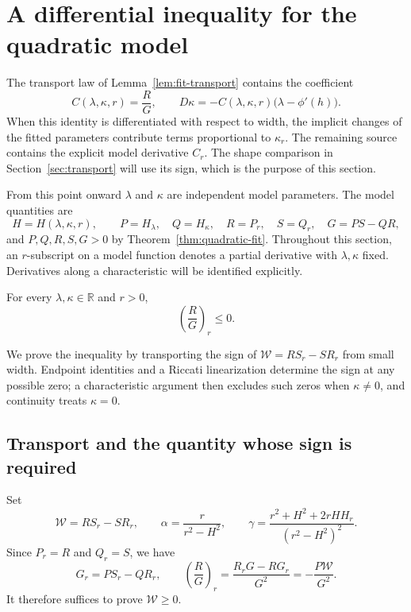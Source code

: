 \section{A differential inequality for the quadratic model}
\label{sec:model}

The transport law of Lemma~\ref{lem:fit-transport} contains the
coefficient
\[
 C(\lambda,\kappa,r)=\frac{R}{G},\qquad
 D\kappa=-C(\lambda,\kappa,r)\bigl(\lambda-\phi'(h)\bigr).
\]
When this identity is differentiated with respect to width, the
implicit changes of the fitted parameters contribute terms proportional
to $\kappa_r$. The remaining source contains the explicit model
derivative $C_r$. The shape comparison in Section~\ref{sec:transport}
will use its sign, which is the purpose of this section.

From this point onward $\lambda$ and $\kappa$ are independent model
parameters. The model quantities are
\[
 H=H(\lambda,\kappa,r),\qquad
 P=H_\lambda,\quad Q=H_\kappa,\quad
 R=P_r,\quad S=Q_r,\quad G=PS-QR,
\]
and $P,Q,R,S,G>0$ by Theorem~\ref{thm:quadratic-fit}.
Throughout this section, an $r$-subscript on a model function denotes a partial derivative
with $\lambda,\kappa$ fixed. Derivatives along a characteristic
will be identified explicitly.

\begin{theorem}
\label{thm:model-inequality}
For every \(\lambda,\kappa\in\mathbb R\) and \(r>0\),
\begin{equation}
 \left(\frac{R}{G}\right)_r\leq 0.
 \label{model:inequality}
\end{equation}
\end{theorem}

We prove the inequality by transporting the sign of
\(\mathcal W=RS_r-SR_r\) from small width. Endpoint identities and
a Riccati linearization determine the sign at any possible zero;
a characteristic argument then excludes such zeros when
\(\kappa\ne0\), and continuity treats \(\kappa=0\).

\subsection{Transport and the quantity whose sign is required}

Set
\begin{equation}
 \mathcal W=RS_r-SR_r,\qquad
 \alpha=\frac{r}{r^2-H^2},\qquad
 \gamma=\frac{r^2+H^2+2rHH_r}{(r^2-H^2)^2}.
 \label{model:definitions}
\end{equation}
Since \(P_r=R\) and \(Q_r=S\), we have
\begin{equation}
 G_r=PS_r-QR_r,\qquad
 \left(\frac RG\right)_r
 =\frac{R_rG-RG_r}{G^2}
 =-\frac{P\mathcal W}{G^2}.
 \label{model:quotient-derivative}
\end{equation}
It therefore suffices to prove \(\mathcal W\geq0\).

